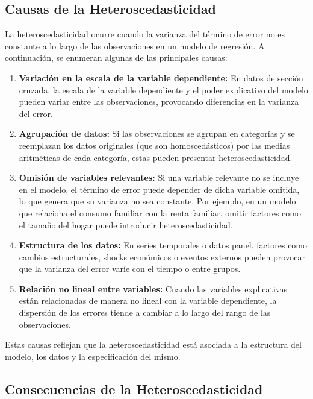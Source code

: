 \documentclass[a4paper,12pt]{article}
\begin{document}
\subsection{Causas de la Heteroscedasticidad}

La heteroscedasticidad ocurre cuando la varianza del término de error no es constante a lo largo de las observaciones en un modelo de regresión. A continuación, se enumeran algunas de las principales causas:

\begin{enumerate}
    \item \textbf{Variación en la escala de la variable dependiente:} 
    En datos de sección cruzada, la escala de la variable dependiente y el poder explicativo del modelo pueden variar entre las observaciones, provocando diferencias en la varianza del error.

    \item \textbf{Agrupación de datos:} 
    Si las observaciones se agrupan en categorías y se reemplazan los datos originales (que son homoscedásticos) por las medias aritméticas de cada categoría, estas pueden presentar heteroscedasticidad.

    \item \textbf{Omisión de variables relevantes:} 
    Si una variable relevante no se incluye en el modelo, el término de error puede depender de dicha variable omitida, lo que genera que su varianza no sea constante. Por ejemplo, en un modelo que relaciona el consumo familiar con la renta familiar, omitir factores como el tamaño del hogar puede introducir heteroscedasticidad.

    \item \textbf{Estructura de los datos:} 
    En series temporales o datos panel, factores como cambios estructurales, shocks económicos o eventos externos pueden provocar que la varianza del error varíe con el tiempo o entre grupos.

    \item \textbf{Relación no lineal entre variables:} 
    Cuando las variables explicativas están relacionadas de manera no lineal con la variable dependiente, la dispersión de los errores tiende a cambiar a lo largo del rango de las observaciones.
\end{enumerate}

Estas causas reflejan que la heteroscedasticidad está asociada a la estructura del modelo, los datos y la especificación del mismo.

\subsection{Consecuencias de la Heteroscedasticidad}
\end{document}
